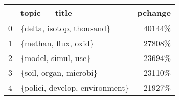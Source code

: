 \begin{tabular}{llr}
\toprule
{} &                    topic\_\_title &  pchange \\
\midrule
0 &       \{delta, isotop, thousand\} &   40144\% \\
1 &            \{methan, flux, oxid\} &   27808\% \\
2 &             \{model, simul, use\} &   23694\% \\
3 &          \{soil, organ, microbi\} &   23110\% \\
4 &  \{polici, develop, environment\} &   21927\% \\
\bottomrule
\end{tabular}
